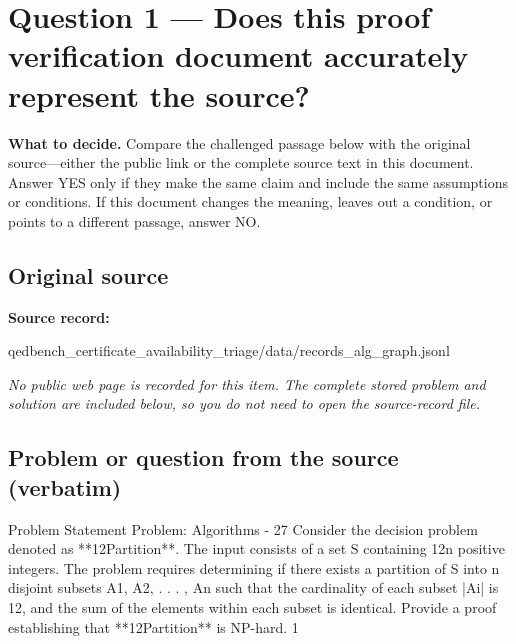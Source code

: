 \documentclass[11pt]{article}
\begin{document}
\section*{Question 1 --- Does this proof verification document accurately represent the source?}
\textbf{What to decide.} Compare the challenged passage below with the original source---either the public link or the complete source text in this document. Answer YES only if they make the same claim and include the same assumptions or conditions. If this document changes the meaning, leaves out a condition, or points to a different passage, answer NO.
\subsection*{Original source}
\textbf{Source record:}
\begin{Vsrc}
qedbench_certificate_availability_triage/data/records_alg_graph.jsonl
\end{Vsrc}
\textit{No public web page is recorded for this item. The complete stored problem and solution are included below, so you do not need to open the source-record file.}
\subsection*{Problem or question from the source (verbatim)}
\begin{Vsrc}
Problem Statement
Problem: Algorithms - 27
Consider the decision problem denoted as **12Partition**. The input consists of a set
S containing 12n positive integers. The problem requires determining if there exists a
partition of S into n disjoint subsets A1, A2, . . . , An such that the cardinality of each
subset |Ai| is 12, and the sum of the elements within each subset is identical. Provide a
proof establishing that **12Partition** is NP-hard.
1
\end{Vsrc}
\end{document}
